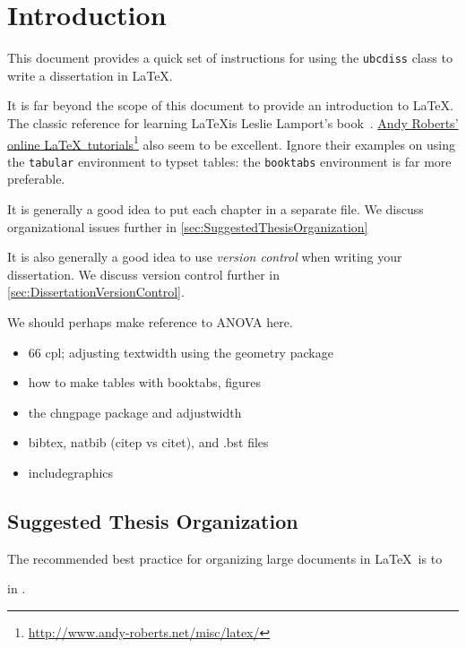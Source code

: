 \chapter{Introduction}
\label{ch:Introduction}

This document provides a quick set of instructions for using the
\verb+ubcdiss+ class to write a dissertation in \LaTeX.

It is far beyond the scope of this document to provide an introduction
to LaTeX.  The classic reference for learning \LaTeX is Leslie Lamport's
book~\cite{lamport-1994-ladps}.
\href{http://www.andy-roberts.net/misc/latex/}{Andy Roberts' online
\LaTeX\ tutorials}\footnote{%
    \url{http://www.andy-roberts.net/misc/latex/}}
also seem to be excellent.  Ignore their examples on using the
\verb+tabular+ environment to typset tables: the \verb+booktabs+
environment is far more preferable.

It is generally a good idea to put each chapter in a separate file.
We discuss organizational issues further in
\autoref{sec:SuggestedThesisOrganization}

It is also generally a good idea to use \emph{version control}
when writing your dissertation.  We discuss version control further
in \autoref{sec:DissertationVersionControl}.

We should perhaps make reference to \ac{ANOVA} here.

\begin{itemize}
\item 66 cpl; adjusting textwidth using the geometry package
\item how to make tables with booktabs, figures
\item the chngpage package and adjustwidth
\item bibtex, natbib (citep vs citet), and .bst files
\item includegraphics
\end{itemize}

\section{Suggested Thesis Organization}
\label{sec:SuggestedThesisOrganization}

The recommended best practice for organizing large documents
in \LaTeX\ is to 

in \label{sec:DissertationVersionControl}.

\endinput

Any text after an \endinput is ignored.
You could put scraps here or things in progress.
